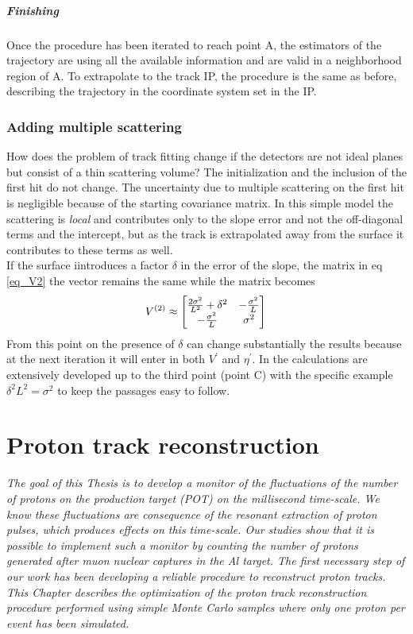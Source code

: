 \documentclass[12pt,a4paper,openright, oneside, titlepage]{book} %
\begin{document}
\paragraph{Finishing} Once the procedure has been iterated  to reach point A, 
the estimators of the trajectory are using all the available information and are valid in a neighborhood region of A. 
To extrapolate to the track IP, 
the procedure is the same as before, 
describing the trajectory in the coordinate system set in the IP. 

\subsection*{Adding multiple scattering}
How does the problem of track fitting change if the detectors are not ideal planes but consist of a thin scattering volume? 
The initialization and the inclusion of the first hit do not change. 
The uncertainty due to multiple scattering on the first hit is negligible because of the starting covariance matrix. 
In this simple model the scattering is \textit{local} and contributes only to the slope error and not the off-diagonal terms 
and the intercept, but as the track is extrapolated away from the surface it contributes to these terms as well.\\
If the surface iintroduces a factor $\delta$ in the error of the slope, 
the matrix in eq \ref{eq_V2} the vector remains the same while the matrix becomes
$$
V^{(2)}\approx
\begin{bmatrix}
\frac{2\sigma^2}{L^2}+\delta^2 & -\frac{\sigma^2}{L} \\
-\frac{\sigma^2}{L} & \sigma^2
\end{bmatrix}\\
$$
From this point on the presence of $\delta$ can change substantially the results because at the next iteration it will enter in both $V^\prime$ and $\eta^\prime$.
 In \cite{KutschkePaper} the calculations are extensively developed up to the third point (point C) 
 with the specific example $\delta^2L^2=\sigma^2$ to keep the passages easy to follow.

\chapter{Proton track reconstruction}
{\itshape 
The goal of this Thesis is to develop a monitor of the fluctuations of the number of protons 
on the production target (POT) on the millisecond time-scale. 
We know these fluctuations are consequence of the resonant extraction of proton pulses, which produces effects on this time-scale. 
Our studies show that it is possible to implement such a monitor by counting the number of protons generated after muon nuclear captures in the Al target. 
The first necessary step of our work has been developing a reliable procedure to reconstruct proton tracks.  
This Chapter describes the optimization of the proton track reconstruction procedure performed using simple Monte Carlo samples where only one proton per event has been simulated.}
\end{document}
